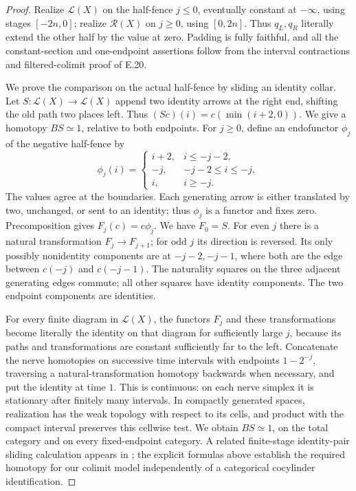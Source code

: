 \begin{proof}
Realize $\mathcal L(X)$ on the half-fence $j\leq0$, eventually constant at $-\infty$, using stages $[-2n,0]$; realize $\mathcal R(X)$ on $j\geq0$, using $[0,2n]$. Thus $q_L,q_R$ literally extend the other half by the value at zero. Padding is fully faithful, and all the constant-section and one-endpoint assertions follow from the interval contractions and filtered-colimit proof of E.20.

We prove the comparison on the actual half-fence by sliding an identity collar. Let $S:\mathcal L(X)\to\mathcal L(X)$ append two identity arrows at the right end, shifting the old path two places left. Thus $(Sc)(i)=c(\min(i+2,0))$. We give a homotopy $BS\simeq1$, relative to both endpoints. For $j\geq0$, define an endofunctor $\phi_j$ of the negative half-fence by
\[
 \phi_j(i)=
 \begin{cases}
 i+2,&i\leq-j-2,\\
 -j,&-j-2\leq i\leq-j,\\
 i,&i\geq-j.
 \end{cases}
\]
The values agree at the boundaries. Each generating arrow is either translated by two, unchanged, or sent to an identity; thus $\phi_j$ is a functor and fixes zero. Precomposition gives $F_j(c)=c\phi_j$. We have $F_0=S$. For even $j$ there is a natural transformation $F_j\to F_{j+1}$; for odd $j$ its direction is reversed. Its only possibly nonidentity components are at $-j-2,-j-1$, where both are the edge between $c(-j)$ and $c(-j-1)$. The naturality squares on the three adjacent generating edges commute; all other squares have identity components. The two endpoint components are identities.

For every finite diagram in $\mathcal L(X)$, the functors $F_j$ and these transformations become literally the identity on that diagram for sufficiently large $j$, because its paths and transformations are constant sufficiently far to the left. Concatenate the nerve homotopies on successive time intervals with endpoints $1-2^{-j}$, traversing a natural-transformation homotopy backwards when necessary, and put the identity at time $1$. This is continuous: on each nerve simplex it is stationary after finitely many intervals. In compactly generated spaces, realization has the weak topology with respect to its cells, and product with the compact interval preserves this cellwise test. We obtain $BS\simeq1$, on the total category and on every fixed-endpoint category. A related finite-stage identity-pair sliding calculation appears in \citet[\S3.2.1, Proposition 3.3]{Shoikhet2016}; the explicit formulas above establish the required homotopy for our colimit model independently of a categorical cocylinder identification.


\end{proof}
